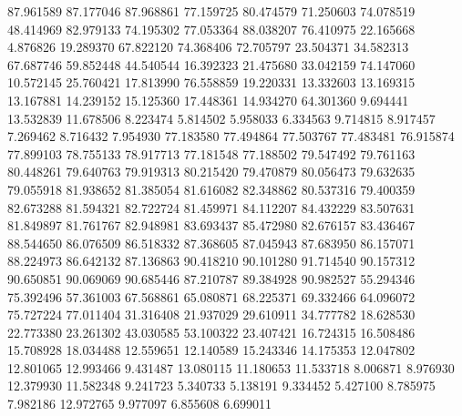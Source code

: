 87.961589
87.177046
87.968861
77.159725
80.474579
71.250603
74.078519
48.414969
82.979133
74.195302
77.053364
88.038207
76.410975
22.165668
4.876826
19.289370
67.822120
74.368406
72.705797
23.504371
34.582313
67.687746
59.852448
44.540544
16.392323
21.475680
33.042159
74.147060
10.572145
25.760421
17.813990
76.558859
19.220331
13.332603
13.169315
13.167881
14.239152
15.125360
17.448361
14.934270
64.301360
9.694441
13.532839
11.678506
8.223474
5.814502
5.958033
6.334563
9.714815
8.917457
7.269462
8.716432
7.954930
77.183580
77.494864
77.503767
77.483481
76.915874
77.899103
78.755133
78.917713
77.181548
77.188502
79.547492
79.761163
80.448261
79.640763
79.919313
80.215420
79.470879
80.056473
79.632635
79.055918
81.938652
81.385054
81.616082
82.348862
80.537316
79.400359
82.673288
81.594321
82.722724
81.459971
84.112207
84.432229
83.507631
81.849897
81.761767
82.948981
83.693437
85.472980
82.676157
83.436467
88.544650
86.076509
86.518332
87.368605
87.045943
87.683950
86.157071
88.224973
86.642132
87.136863
90.418210
90.101280
91.714540
90.157312
90.650851
90.069069
90.685446
87.210787
89.384928
90.982527
55.294346
75.392496
57.361003
67.568861
65.080871
68.225371
69.332466
64.096072
75.727224
77.011404
31.316408
21.937029
29.610911
34.777782
18.628530
22.773380
23.261302
43.030585
53.100322
23.407421
16.724315
16.508486
15.708928
18.034488
12.559651
12.140589
15.243346
14.175353
12.047802
12.801065
12.993466
9.431487
13.080115
11.180653
11.533718
8.006871
8.976930
12.379930
11.582348
9.241723
5.340733
5.138191
9.334452
5.427100
8.785975
7.982186
12.972765
9.977097
6.855608
6.699011
